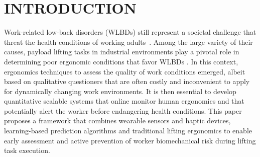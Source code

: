 
\section{INTRODUCTION}
\label{sec:introduction}
Work-related low-back disorders (WLBDs) still represent a societal challenge that 
threat the health conditions of working adults~\cite{Health1981}. Among the large variety of their causes, 
payload lifting tasks in industrial environments play a pivotal role in determining poor ergonomic conditions that favor WLBDs \cite{Kuijer2014, Lu2014, Waters2011}. In this context, ergonomics techniques to assess the quality of work conditions emerged, albeit based on qualitative questioners that are often costly and inconvenient to apply 
for dynamically changing work environments. It is then essential to develop quantitative scalable systems that online monitor human ergonomics and that potentially alert the worker before endangering health conditions.  
This paper proposes a framework that combines wearable sensors and haptic devices, learning-based prediction algorithms and traditional lifting ergonomics to enable early assessment and active prevention of worker biomechanical risk during lifting task execution. 
